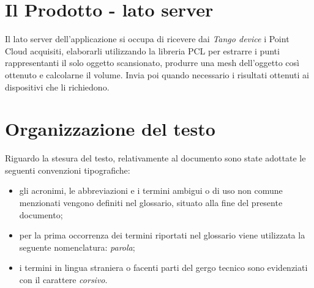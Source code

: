 \newpage

\section{Il Prodotto - lato server}
Il lato server dell'applicazione si occupa di ricevere dai \emph{Tango device} i Point Cloud acquisiti, elaborarli utilizzando la libreria PCL per estrarre i punti rappresentanti il solo oggetto scansionato, produrre una mesh dell'oggetto così ottenuto e calcolarne il volume. Invia poi quando necessario i risultati ottenuti ai dispositivi che li richiedono.


\section{Organizzazione del testo}
Riguardo la stesura del testo, relativamente al documento sono state adottate le seguenti convenzioni tipografiche:
\begin{itemize}
	\item gli acronimi, le abbreviazioni e i termini ambigui o di uso non comune menzionati vengono definiti nel glossario, situato alla fine del presente documento;
	\item per la prima occorrenza dei termini riportati nel glossario viene utilizzata la seguente nomenclatura: \emph{parola}\glsfirstoccur;
	\item i termini in lingua straniera o facenti parti del gergo tecnico sono evidenziati con il carattere \emph{corsivo}.
\end{itemize}